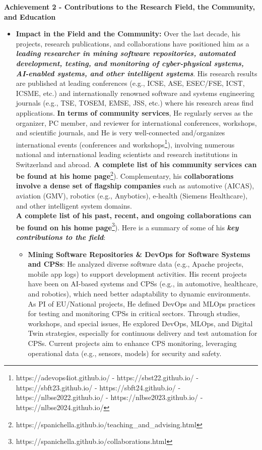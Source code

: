 \documentclass[11pt]{article}
\begin{document}
\vspace{1mm}
\noindent \textbf{Achievement 2 - Contributions to the Research Field, the Community, and Education}
\vspace{-2.5mm}
\begin{itemize} 
\item \textbf{Impact in the Field and the Community:} 
Over the last decade, his projects, research publications, and collaborations have positioned him as a \textbf{\textit{leading researcher in mining software repositories, automated development, testing, and monitoring of cyber-physical systems, AI-enabled systems, and other intelligent systems}}. 
His research results are published at leading conferences (e.g., ICSE, ASE, ESEC/FSE, ICST, ICSME, etc.) and internationally renowned software and
systems engineering journals (e.g., TSE, TOSEM, EMSE, JSS, etc.) where his research areas find applications. 
\textbf{In terms of community services}, He regularly serves as the organizer, PC member, and reviewer for international conferences, workshops, and scientific journals, and He is very well-connected and/organizes international events
(conferences and workshops\footnote{https://adevops4iot.github.io/
-	https://sbst22.github.io/ - https://sbft23.github.io/ - https://sbft24.github.io/ -	https://nlbse2022.github.io/ - https://nlbse2023.github.io/ - https://nlbse2024.github.io/}), involving numerous national and international leading scientists
and research institutions in Switzerland and abroad. \textbf{A complete list of his community services can be found at his home page}\footnote{https://spanichella.github.io/teaching\_and\_advising.html}). 
Complementary, his \textbf{collaborations involve a dense set of flagship companies} such as automotive (AICAS), aviation (GMV), robotics (e.g.,
Anybotics), e-health (Siemens Healthcare), and other intelligent system domains.  \\
\textbf{A complete list of his past, recent, and ongoing collaborations can be found on his home page}\footnote{https://spanichella.github.io/collaborations.html}). 
Here is a summary of some of his \textbf{\textit{key contributions to the field}}:  
\begin{itemize}
\vspace{-2.5mm}
\item 
\textbf{Mining Software Repositories \& DevOps for Software Systems and CPSs}: He analyzed diverse software data (e.g., Apache projects, mobile app logs) to support development activities. His recent projects have been on AI-based systems and CPSs (e.g., in automotive, healthcare, and robotics), which need better adaptability to dynamic environments. As PI of EU/National projects, He defined DevOps and MLOps practices for testing and monitoring CPSs in critical sectors. Through studies, workshops, and special issues, He explored DevOps, MLOps, and Digital Twin strategies, especially for continuous delivery and test automation for CPSs. Current projects aim to enhance CPS monitoring, leveraging operational data (e.g., sensors, models) for security and safety.


\end{itemize}
\end{itemize}
\end{document}
